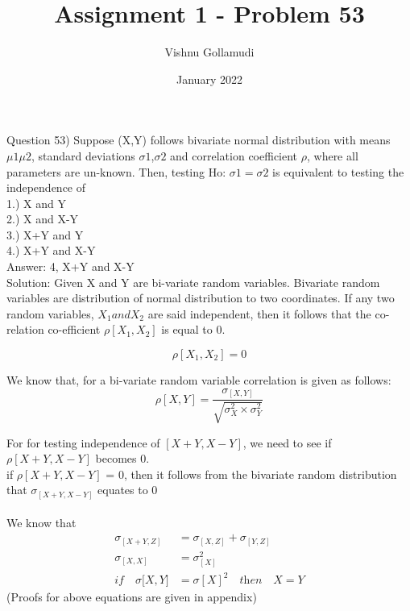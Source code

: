 \documentclass{article}
\title{Assignment 1 - Problem 53}
\author{Vishnu Gollamudi}
\date{January 2022}
\begin{document}
\maketitle

Question 53) Suppose (X,Y) follows bivariate normal distribution with means $\mu1  \mu2$, standard deviations $\sigma1$,$\sigma2$ and correlation coefficient $\rho$, where all parameters are un-known. Then, testing Ho: $\sigma1=\sigma2$ is equivalent to testing the independence of  
\\
1.) X and Y \\
2.) X and X-Y \\
3.) X+Y and Y \\
4.) X+Y and X-Y \\

Answer: 4, X+Y and X-Y \\
Solution:
Given X and Y are bi-variate random variables.  Bivariate random variables are distribution of normal distribution to two coordinates. If any two random variables, $ X_1 and X_2$ are said independent, then it follows that the co-relation co-efficient $\rho[X_1,X_2]$ is equal to 0. \smallskip

\begin{equation*}
\rho[X_1,X_2]  = 0
\end{equation*}

We know that, for a bi-variate random variable correlation is given as follows:
\begin{equation*}
    \rho[X,Y] = \frac{\sigma_{[X,Y]} } {\sqrt{\sigma_X^2 \times \sigma_Y^2}}
\end{equation*}


For for testing independence of $[X+Y, X-Y]$, we need to see if  $\rho[X+Y,X-Y]$ becomes 0.\\
if  $\rho[X+Y,X-Y]$  = 0, then it follows from the bivariate random distribution that $\sigma_{[X+Y,X-Y]}$ equates to 0\\
\\
We know that
\\
\begin{align}
  \sigma_{[X+Y,Z]} &= \sigma_{[X,Z]} + \sigma_{[Y,Z]} \\
  \sigma_{[X,X]} &= \sigma_{[X]}^2 \\
  \textit{if}\quad \sigma{[X,Y}] &= \sigma{[X]}^2 \quad \textit{then} \quad X=Y
\end{align}
\large (Proofs for above equations are given in appendix)
\end{document}
